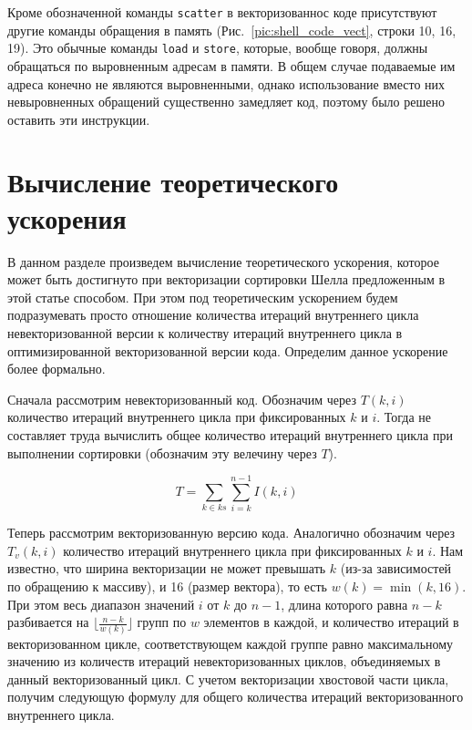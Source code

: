 \documentclass[utf8]{psta}
\begin{document}
Кроме обозначенной команды \texttt{scatter} в векторизованнос коде присутствуют другие команды обращения в память (Рис.~\ref{pic:shell_code_vect}, строки 10, 16, 19). 
Это обычные команды \texttt{load} и \texttt{store}, которые, вообще говоря, должны обращаться по выровненным адресам в памяти. 
В общем случае подаваемые им адреса конечно не являются выровненными, однако использование вместо них невыровненных обращений существенно замедляет код, поэтому было решено оставить эти инструкции.

\section{Вычисление теоретического ускорения}

В данном разделе произведем вычисление теоретического ускорения, которое может быть достигнуто при векторизации сортировки Шелла предложенным в этой статье способом. 
При этом под теоретическим ускорением будем подразумевать просто отношение количества итераций внутреннего цикла невекторизованной версии к количеству итераций внутреннего цикла в оптимизированной векторизованной версии кода. Определим данное ускорение более формально.

Сначала рассмотрим невекторизованный код. Обозначим через $T(k, i)$ количество итераций внутреннего цикла при фиксированных $k$ и $i$. 
Тогда не составляет труда вычислить общее количество итераций внутреннего цикла при выполнении сортировки (обозначим эту велечину через $T$).

\begin{equation}
T = \sum_{k \in ks}{\sum_{i = k}^{n - 1}{I(k, i)}}
\end{equation}

Теперь рассмотрим векторизованную версию кода. 
Аналогично обозначим через $T_v(k,i)$ количество итераций внутреннего цикла при фиксированных $k$ и $i$. 
Нам известно, что ширина векторизации не может превышать $k$ (из-за зависимостей по обращению к массиву), и 16 (размер вектора), то есть $w(k) = \min(k, 16)$. 
При этом весь диапазон значений $i$ от $k$ до $n - 1$, длина которого равна $n - k$ разбивается на $\lfloor \frac{n - k}{w(k)} \rfloor$ групп по $w$ элементов в каждой, и количество итераций в векторизованном цикле, соответствующем каждой группе равно максимальному значению из количеств итераций невекторизованных циклов, объединяемых в данный векторизованный цикл. 
С учетом векторизации хвостовой части цикла, получим следующую формулу для общего количества итераций векторизованного внутреннего цикла.
\end{document}
